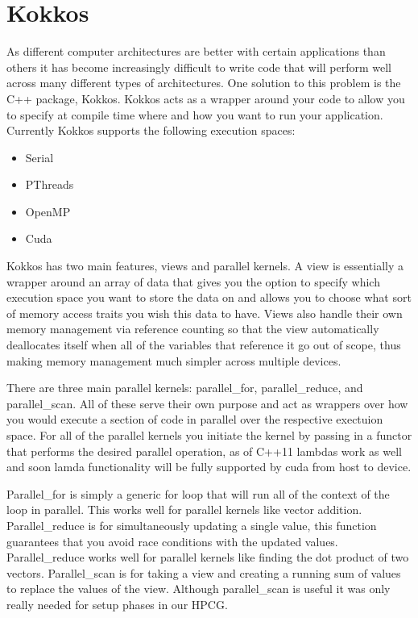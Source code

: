 \documentclass{ccr15}
\begin{document}
\section{Kokkos}
As different computer architectures are better with certain applications than others it has
become increasingly difficult to write code that will perform well across many different types of
architectures. One solution to this problem is the C++ package, Kokkos. Kokkos acts as a wrapper
around your code to allow you to specify at compile time where and how you want to run your
application. Currently Kokkos supports the following execution spaces:
\begin{itemize}
	\item Serial
	\item PThreads
	\item OpenMP
	\item Cuda
\end{itemize}

Kokkos has two main features, views and parallel kernels. A view is essentially a wrapper around
an array of data that gives you the option to specify which execution space you want to store the
data on and allows you to choose what sort of memory access traits you wish this data to have.
Views also handle their own memory management via reference counting so that the view
automatically deallocates itself when all of the variables that reference it go out of scope,
thus making memory management much simpler across multiple devices.

There are three main parallel kernels: parallel\_for, parallel\_reduce, and parallel\_scan. All 
of these serve their own purpose and act as wrappers over how you would execute a section of 
code in parallel over the respective exectuion space. For all of the parallel kernels you 
initiate the kernel by passing in a functor that performs the desired parallel operation, as of 
C++11 lambdas work as well and soon lamda functionality will be fully supported by cuda from 
host to device.

Parallel\_for is simply a generic for loop that will run all of the context of the loop in
parallel. This works well for parallel kernels like vector addition. Parallel\_reduce is for 
simultaneously updating a single value, this function guarantees that you avoid race conditions 
with the updated values. Parallel\_reduce works well for parallel kernels like finding the dot
product of two vectors. Parallel\_scan is for taking a view and creating a running sum of values
to replace the values of the view. Although parallel\_scan is useful it was only really needed
for setup phases in our HPCG.
\end{document}
